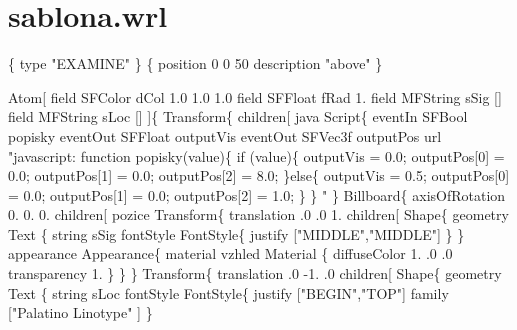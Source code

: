 \section{\label{priloha:vrml}sablona.wrl}
\begin{kodblok}
 \{ type "EXAMINE" \}
 \{
  position 0 0 50
  description "above"
\}
\komentH{# \dots}

 Atom[
    field SFColor   dCol 1.0 1.0 1.0  
    field SFFloat   fRad 1.           
    field MFString  sSig []           
    field MFString  sLoc []           
    ]\{
  Transform\{
    children[
       java Script\{
        eventIn   SFBool   popisky
        eventOut  SFFloat  outputVis
        eventOut  SFVec3f  outputPos
        url "javascript:
          function popisky(value)\{
            if (value)\{
              outputVis = 0.0;
              outputPos[0] = 0.0;
              outputPos[1] = 0.0;
              outputPos[2] = 8.0;
            \}else\{
              outputVis = 0.5;
              outputPos[0] = 0.0;
              outputPos[1] = 0.0;
              outputPos[2] = 1.0;
            \}
          \}
        "
      \}
      Billboard\{
        axisOfRotation 0. 0. 0.
        children[
           pozice Transform\{
            translation .0 .0 1. 
            children[
              Shape\{      
                geometry Text \{
                  string  sSig
                  fontStyle FontStyle\{
                    justify ["MIDDLE","MIDDLE"]
                  \}
                \}
                appearance
                  Appearance\{
                    material  vzhled Material \{
                      diffuseColor 1. .0 .0  
                      transparency 1.
                    \}
                  \}
              \}
              Transform\{  
                translation .0 -1. .0
                children[
                  Shape\{
                    geometry Text \{
                      string  sLoc
                      fontStyle FontStyle\{
                        justify ["BEGIN","TOP"]
                        family ["Palatino Linotype" ]
                      \}

\end{kodblok}
